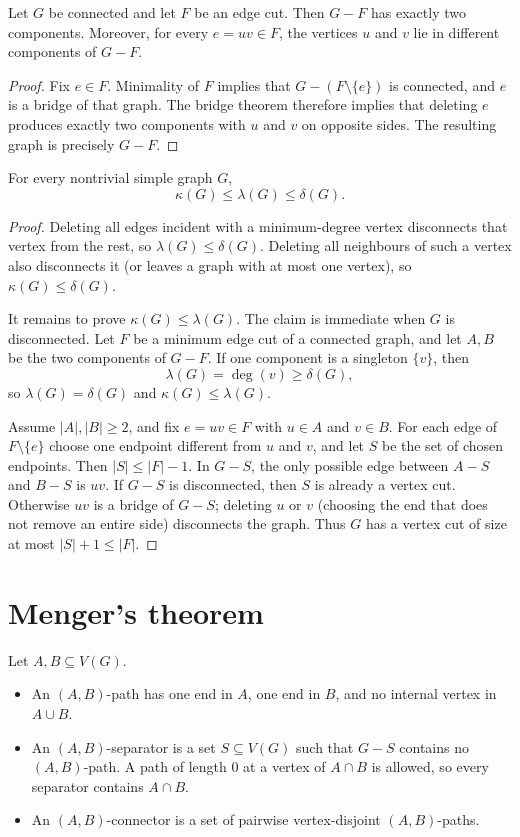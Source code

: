 \begin{notetheorem}
Let $G$ be connected and let $F$ be an edge cut.  Then $G-F$ has exactly two components.  Moreover, for every $e=uv\in F$, the vertices $u$ and $v$ lie in different components of $G-F$.
\end{notetheorem}
\begin{proof}
Fix $e\in F$.  Minimality of $F$ implies that $G-(F\setminus\{e\})$ is connected, and $e$ is a bridge of that graph.  The bridge theorem therefore implies that deleting $e$ produces exactly two components with $u$ and $v$ on opposite sides.  The resulting graph is precisely $G-F$.
\end{proof}
\begin{notetheorem}
For every nontrivial simple graph $G$,
\[
  \kappa(G)\le\lambda(G)\le\delta(G).
\]
\end{notetheorem}
\begin{proof}
Deleting all edges incident with a minimum-degree vertex disconnects that vertex from the rest, so $\lambda(G)\le\delta(G)$.  Deleting all neighbours of such a vertex also disconnects it (or leaves a graph with at most one vertex), so $\kappa(G)\le\delta(G)$.

It remains to prove $\kappa(G)\le\lambda(G)$.  The claim is immediate when $G$ is disconnected.  Let $F$ be a minimum edge cut of a connected graph, and let $A,B$ be the two components of $G-F$.  If one component is a singleton $\{v\}$, then
\[
  \lambda(G)=\deg(v)\ge\delta(G),
\]
so $\lambda(G)=\delta(G)$ and $\kappa(G)\le\lambda(G)$.

Assume $|A|,|B|\ge2$, and fix $e=uv\in F$ with $u\in A$ and $v\in B$.  For each edge of $F\setminus\{e\}$ choose one endpoint different from $u$ and $v$, and let $S$ be the set of chosen endpoints.  Then $|S|\le|F|-1$.  In $G-S$, the only possible edge between $A-S$ and $B-S$ is $uv$.  If $G-S$ is disconnected, then $S$ is already a vertex cut.  Otherwise $uv$ is a bridge of $G-S$; deleting $u$ or $v$ (choosing the end that does not remove an entire side) disconnects the graph.  Thus $G$ has a vertex cut of size at most $|S|+1\le|F|$.
\end{proof}
\section{Menger's theorem}

\begin{notedefinition}
Let $A,B\subseteq V(G)$.
\begin{itemize}
  \item An $(A,B)$-path has one end in $A$, one end in $B$, and no internal vertex in $A\cup B$.
  \item An $(A,B)$-separator is a set $S\subseteq V(G)$ such that $G-S$ contains no $(A,B)$-path.  A path of length $0$ at a vertex of $A\cap B$ is allowed, so every separator contains $A\cap B$.
  \item An $(A,B)$-connector is a set of pairwise vertex-disjoint $(A,B)$-paths.
\end{itemize}
\end{notedefinition}

